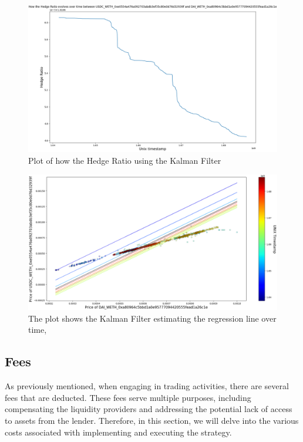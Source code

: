 \begin{figure}[!htb]
    \centering
    \includegraphics[width=\textwidth]{project/Images/Evolving_hedge_ratio_kf.png}
    \caption{Plot of how the Hedge Ratio using the Kalman Filter \label{fig:evolving_hedge_ratio_kf}}
\end{figure}

\begin{figure}[!htb]
    \centering
    \includegraphics[width=\textwidth]{project/Images/plots_1.png}
    \caption{The plot shows the Kalman Filter estimating the regression line over time, \label{fig:ratios_kf}}
\end{figure}

\subsection{Fees}
As previously mentioned, when engaging in trading activities, there are several fees that are deducted. These fees serve multiple purposes, including compensating the liquidity providers and addressing the potential lack of access to assets from the lender. Therefore, in this section, we will delve into the various costs associated with implementing and executing the strategy.

